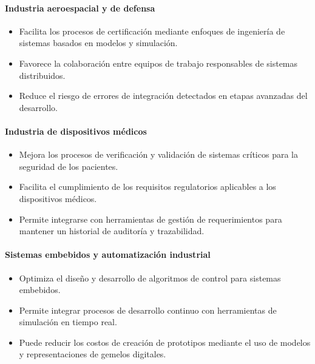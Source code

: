 \documentclass[12pt,a4paper]{article}
\begin{document}
\paragraph{Industria aeroespacial y de defensa}

\begin{itemize}
    \item Facilita los procesos de certificación mediante enfoques de ingeniería de sistemas basados en modelos y simulación.
    \item Favorece la colaboración entre equipos de trabajo responsables de sistemas distribuidos.
    \item Reduce el riesgo de errores de integración detectados en etapas avanzadas del desarrollo.
\end{itemize}

\paragraph{Industria de dispositivos médicos}

\begin{itemize}
    \item Mejora los procesos de verificación y validación de sistemas críticos para la seguridad de los pacientes.
    \item Facilita el cumplimiento de los requisitos regulatorios aplicables a los dispositivos médicos.
    \item Permite integrarse con herramientas de gestión de requerimientos para mantener un historial de auditoría y trazabilidad.
\end{itemize}

\paragraph{Sistemas embebidos y automatización industrial}

\begin{itemize}
    \item Optimiza el diseño y desarrollo de algoritmos de control para sistemas embebidos.
    \item Permite integrar procesos de desarrollo continuo con herramientas de simulación en tiempo real.
    \item Puede reducir los costos de creación de prototipos mediante el uso de modelos y representaciones de gemelos digitales.
\end{itemize}


\end{document}
